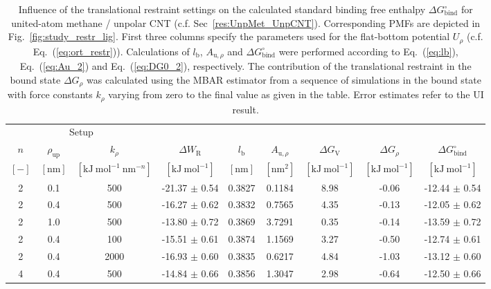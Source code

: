 \documentclass[9pt,lessons,pubversion]{livecoms}
\begin{document}
\begin{table}[ht]
\caption{\label{tbl:1Dsetup}
Influence of the translational restraint settings on the calculated standard binding free enthalpy $\Delta G^\circ_\mathrm{bind}$ for united-atom methane / unpolar CNT (c.f. Sec~\ref{res:UnpMet_UnpCNT}).
Corresponding PMFs are depicted in Fig.~\ref{fig:study_restr_lig}. 
First three columns specify the parameters used for the flat-bottom potential $U_\rho$ (c.f. Eq.~(\ref{eq:ort_restr})). 
Calculations of $l_\mathrm{b}$, $A_{\mathrm{u},\rho}$ and $\Delta G^\circ_\mathrm{bind}$ were performed according to Eq.~(\ref{eq:lb}), Eq.~(\ref{eq:Au_2}) and Eq.~(\ref{eq:DG0_2}), respectively. 
The contribution of the translational restraint in the bound state $\Delta G_\rho$ was calculated using the MBAR estimator from a sequence of simulations in the bound state with force constants $k_\rho$ varying from zero to the final value as given in the table. Error estimates refer to the UI result.
}
\centering
\begin{tabular}{ccc ccc ccc}\hline
\multicolumn{3}{c}{Setup} &  \\
\cline{1-3} 
$n$ & $\rho_\mathrm{up}$ & $k_\rho$  & $\Delta W_\mathrm{R}$  & $l_\mathrm{b}$ & $A_{\mathrm{u},\rho}$ & $\Delta G_\mathrm{V}$ & 
$\Delta G_\rho$ & $\Delta G^\circ_\mathrm{bind}$ \\
$[-]$ & $[\mathrm{nm}]$ & $[\mathrm{kJ~mol}^{-1}~\mathrm{nm}^{-n}]$ & $[\mathrm{kJ~mol}^{-1}]$ & $[\mathrm{nm}]$ & $[\mathrm{nm}^2]$ & $[\mathrm{kJ~mol}^{-1}]$ & $[\mathrm{kJ~mol}^{-1}]$ & 
$[\mathrm{kJ~mol}^{-1}]$ \\ 
\hline
2 & 0.1 & 500  &  -21.37 $\pm$ 0.54 & 0.3827 &  0.1184 &  8.98  & -0.06 &  -12.44 $\pm$  0.54 \\   
2 & 0.4 & 500  &  -16.27 $\pm$ 0.62 & 0.3832 &  0.7565 &  4.35  & -0.13 &  -12.05 $\pm$  0.62\\
2 & 1.0 & 500  &  -13.80 $\pm$ 0.72 & 0.3869 &  3.7291 &  0.35  &  -0.14  &  -13.59 $\pm$ 0.72\\
2 & 0.4 & 100  &  -15.51 $\pm$ 0.61 & 0.3874 &  1.1569 &  3.27  &  -0.50 &  -12.74 $\pm$ 0.61\\
2 & 0.4 & 2000 & -16.93 $\pm$ 0.60 & 0.3835 &  0.6217 &  4.84  &  -1.03  &  -13.12 $\pm$ 0.60\\
4 & 0.4 & 500  &  -14.84 $\pm$ 0.66 & 0.3856 &  1.3047 &  2.98  &  -0.64 &  -12.50 $\pm$ 0.66\\ 
\hline
\end{tabular}
\end{table}
\end{document}
